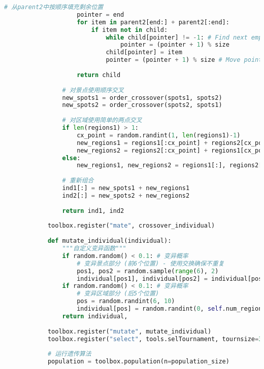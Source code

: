 \begin{lstlisting}[language=Python]
                    # 从parent2中按顺序填充剩余位置
                    pointer = end
                    for item in parent2[end:] + parent2[:end]:
                        if item not in child:
                            while child[pointer] != -1: # Find next empty spot
                                pointer = (pointer + 1) % size
                            child[pointer] = item
                            pointer = (pointer + 1) % size # Move pointer for next item
                    
                    return child
                
                # 对景点使用顺序交叉
                new_spots1 = order_crossover(spots1, spots2)
                new_spots2 = order_crossover(spots2, spots1)
                
                # 对区域使用简单的两点交叉
                if len(regions1) > 1:
                    cx_point = random.randint(1, len(regions1)-1)
                    new_regions1 = regions1[:cx_point] + regions2[cx_point:]
                    new_regions2 = regions2[:cx_point] + regions1[cx_point:]
                else:
                    new_regions1, new_regions2 = regions1[:], regions2[:]
                
                # 重新组合
                ind1[:] = new_spots1 + new_regions1
                ind2[:] = new_spots2 + new_regions2
                
                return ind1, ind2
            
            toolbox.register("mate", crossover_individual)
    
            def mutate_individual(individual):
                """自定义变异函数"""
                if random.random() < 0.1: # 变异概率
                    # 变异景点部分 (前6个位置) - 使用交换确保不重复
                    pos1, pos2 = random.sample(range(6), 2)
                    individual[pos1], individual[pos2] = individual[pos2], individual[pos1]
                if random.random() < 0.1: # 变异概率
                    # 变异区域部分 (后5个位置)
                    pos = random.randint(6, 10)
                    individual[pos] = random.randint(0, self.num_regions-1)
                return individual,
            
            toolbox.register("mutate", mutate_individual)
            toolbox.register("select", tools.selTournament, tournsize=3)
            
            # 运行遗传算法
            population = toolbox.population(n=population_size)
            

\end{lstlisting}
